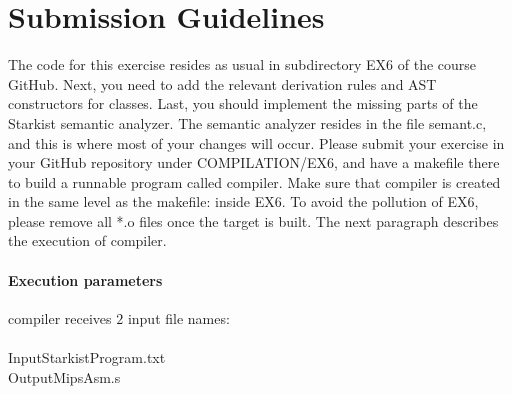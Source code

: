 \documentclass{article}
\begin{document}
\section{Submission Guidelines}
The code for this exercise resides as usual in subdirectory EX6 of the course GitHub.
Next, you need to add the relevant derivation rules and AST constructors
for classes. Last, you should implement the missing parts of the Starkist semantic analyzer.
The semantic analyzer resides in the file semant.c, and this is where
most of your changes will occur.
Please submit your exercise in your GitHub repository under COMPILATION/EX6,
and have a makefile there to build a runnable program called compiler.
Make sure that compiler is created in the same level as the makefile: inside EX6.
To avoid the pollution of EX6, please remove all *.o files once the target is built.
The next paragraph describes the execution of compiler.

\paragraph{Execution parameters}
compiler receives $2$ input file names:\\ \\
InputStarkistProgram.txt\\
OutputMipsAsm.s
\end{document}
